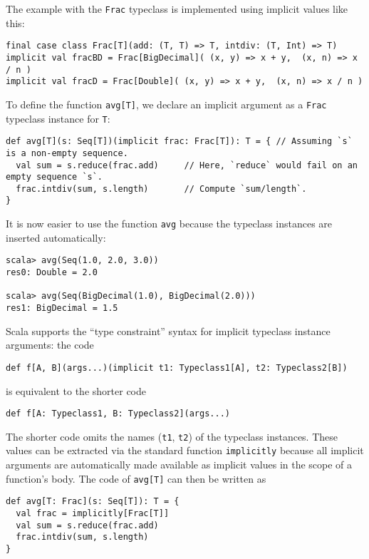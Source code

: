 The example with the \lstinline!Frac! typeclass is implemented using
implicit values like this:
\begin{lstlisting}
final case class Frac[T](add: (T, T) => T, intdiv: (T, Int) => T)
implicit val fracBD = Frac[BigDecimal]( (x, y) => x + y,  (x, n) => x / n )
implicit val fracD = Frac[Double]( (x, y) => x + y,  (x, n) => x / n )
\end{lstlisting}
To define the function \lstinline!avg[T]!, we declare an implicit
argument as a \lstinline!Frac! typeclass instance for \lstinline!T!:
\begin{lstlisting}
def avg[T](s: Seq[T])(implicit frac: Frac[T]): T = { // Assuming `s` is a non-empty sequence.
  val sum = s.reduce(frac.add)     // Here, `reduce` would fail on an empty sequence `s`.
  frac.intdiv(sum, s.length)       // Compute `sum/length`.
}
\end{lstlisting}
It is now easier to use the function \lstinline!avg! because the
typeclass instances are inserted automatically:
\begin{lstlisting}
scala> avg(Seq(1.0, 2.0, 3.0))
res0: Double = 2.0

scala> avg(Seq(BigDecimal(1.0), BigDecimal(2.0)))
res1: BigDecimal = 1.5
\end{lstlisting}

Scala supports the \textsf{``}type constraint\textsf{''} syntax for implicit typeclass
instance arguments: the code
\begin{lstlisting}
def f[A, B](args...)(implicit t1: Typeclass1[A], t2: Typeclass2[B])
\end{lstlisting}
is equivalent to the shorter code 
\begin{lstlisting}
def f[A: Typeclass1, B: Typeclass2](args...)
\end{lstlisting}
The shorter code omits the names (\lstinline!t1!, \lstinline!t2!)
of the typeclass instances. These values can be extracted via the
standard function \lstinline!implicitly! because all implicit arguments
are automatically made available as implicit values in the scope of
a function\textsf{'}s body. The code of \lstinline!avg[T]! can then be written
as
\begin{lstlisting}
def avg[T: Frac](s: Seq[T]): T = {
  val frac = implicitly[Frac[T]]
  val sum = s.reduce(frac.add)
  frac.intdiv(sum, s.length)
}
\end{lstlisting}

